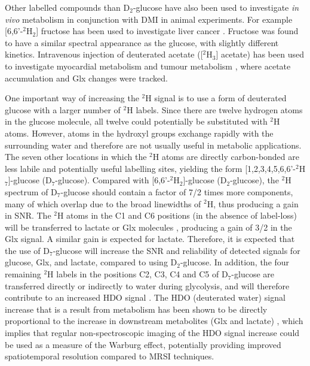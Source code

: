 Other labelled compounds than D$_2$-glucose have also been used to investigate \textit{in vivo} metabolism in conjunction with \ac{DMI} in animal experiments. For example [6,6'-$^2$H$_2$] fructose has been used to investigate liver cancer \cite{Zhang202366-2H2Cancer}. Fructose was found to have a similar spectral appearance as the glucose, with slightly different kinetics. Intravenous injection of deuterated acetate ([$^2$H$_3$] acetate) has been used to investigate myocardial metabolism \cite{Wang2021NoninvasiveImaging} and tumour metabolism \cite{DeFeyter2018DeuteriumVivo}, where acetate accumulation and Glx changes were tracked.

One important way of increasing the $^2$H signal is to use a form of deuterated glucose with a larger number of $^2$H labels. Since there are twelve hydrogen atoms in the glucose molecule, all twelve could potentially be substituted with $^2$H atoms. However, atoms in the hydroxyl groups exchange rapidly with the surrounding water and therefore are not usually useful in metabolic applications. The seven other locations in which the $^2$H atoms are directly carbon-bonded are less labile and potentially useful labelling sites, yielding the form [1,2,3,4,5,6,6'-$^2$H$_7$]-glucose (D$_7$-glucose). Compared with [6,6'-$^2$H$_2$]-glucose (D$_2$-glucose), the $^2$H spectrum of D$_7$-glucose should contain a factor of 7/2 times more components, many of which overlap due to the broad linewidths of $^2$H, thus producing a gain in \ac{SNR}. The $^2$H atoms in the C1 and C6 positions (in the absence of label-loss) will be transferred to lactate or Glx molecules \cite{DeFeyter2020DeuteriumBrain}, producing a gain of 3/2 in the Glx signal. A similar gain is expected for lactate. Therefore, it is expected that the use of D$_7$-glucose will increase the \ac{SNR} and reliability of detected signals for glucose, Glx, and lactate, compared to using D$_2$-glucose. In addition, the four remaining $^2$H labels in the positions C2, C3, C4 and C5 of D$_7$-glucose are transferred directly or indirectly to water during glycolysis, and will therefore contribute to an increased \ac{HDO} signal \cite{Mahar2020HDOMetabolism, Mahar2021DeuteratedGlucose}. The \ac{HDO} (deuterated water) signal increase that is a result from metabolism has been shown to be directly proportional to the increase in downstream metabolites (Glx and lactate) \cite{Mahar2021DeuteratedGlucose}, which implies that regular non-spectroscopic imaging of the \ac{HDO} signal increase could be used as a measure of the Warburg effect, potentially providing improved spatiotemporal resolution compared to \ac{MRSI} techniques. 

